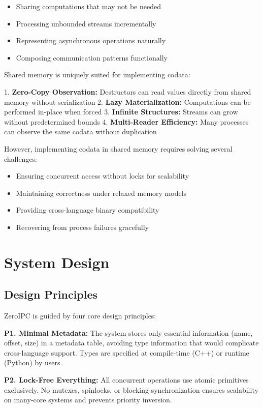 \documentclass[11pt]{article}
\begin{document}
\begin{itemize}
\item Sharing computations that may not be needed
\item Processing unbounded streams incrementally
\item Representing asynchronous operations naturally
\item Composing communication patterns functionally
\end{itemize}

Shared memory is uniquely suited for implementing codata:

1. \textbf{Zero-Copy Observation:} Destructors can read values directly from shared memory without serialization
2. \textbf{Lazy Materialization:} Computations can be performed in-place when forced
3. \textbf{Infinite Structures:} Streams can grow without predetermined bounds
4. \textbf{Multi-Reader Efficiency:} Many processes can observe the same codata without duplication

However, implementing codata in shared memory requires solving several challenges:
\begin{itemize}
\item Ensuring concurrent access without locks for scalability
\item Maintaining correctness under relaxed memory models
\item Providing cross-language binary compatibility
\item Recovering from process failures gracefully
\end{itemize}

\section{System Design}

\subsection{Design Principles}

ZeroIPC is guided by four core design principles:

\textbf{P1. Minimal Metadata:} The system stores only essential information (name, offset, size) in a metadata table, avoiding type information that would complicate cross-language support. Types are specified at compile-time (C++) or runtime (Python) by users.

\textbf{P2. Lock-Free Everything:} All concurrent operations use atomic primitives exclusively. No mutexes, spinlocks, or blocking synchronization ensures scalability on many-core systems and prevents priority inversion.
\end{document}
